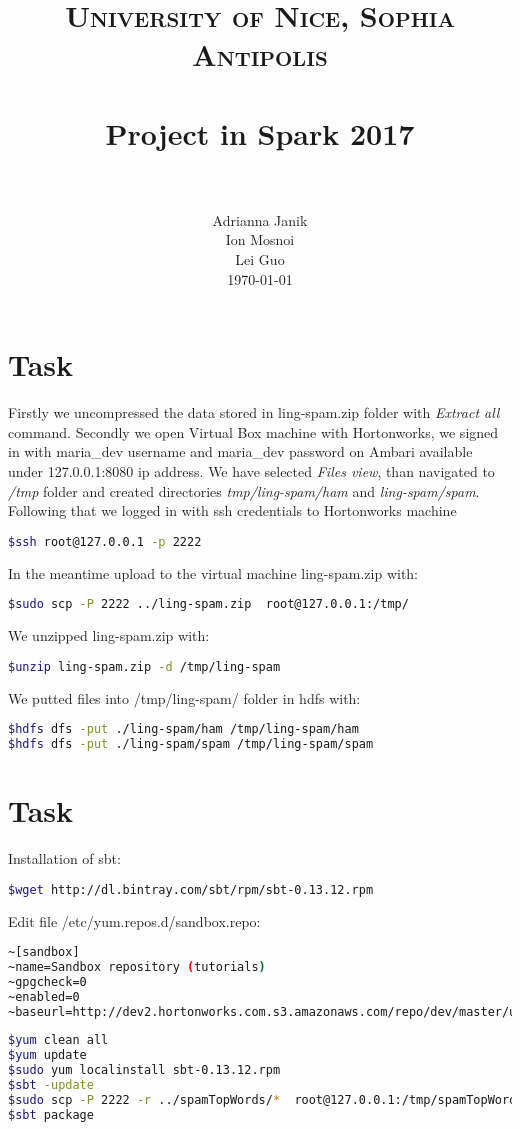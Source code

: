\documentclass[paper=a4, fontsize=11pt]{scrartcl}
\title{
		\usefont{OT1}{bch}{b}{n}
		\normalfont \normalsize \textsc{University of Nice, Sophia Antipolis} \\ [25pt]
		\horrule{0.5pt} \\[0.4cm]
		\huge Project in Spark 2017 \\
		\horrule{2pt} \\[0.5cm]
}
\author{
		\normalfont \normalsize
        Adrianna Janik\\	\normalfont \normalsize
Ion Mosnoi\\	\normalfont \normalsize
Lei Guo \\ \normalsize
        \today
}
\date{}
\numberwithin{equation}{section}		%
\numberwithin{figure}{section}			%
\numberwithin{table}{section}				%
\begin{document}
\maketitle
\section{Task}
Firstly we uncompressed the data stored in ling-spam.zip folder with \textit{Extract all} command. 
Secondly we open Virtual Box machine with Hortonworks, we signed in with maria\_dev username and maria\_dev password on Ambari available under 127.0.0.1:8080 ip address. We have selected \textit{Files view}, than navigated to \textit{/tmp} folder and created directories \textit{tmp/ling-spam/ham} and \textit{ling-spam/spam}. Following that we logged in with ssh credentials to Hortonworks machine
\begin{lstlisting}[language=bash]
$ssh root@127.0.0.1 -p 2222
\end{lstlisting}
In the meantime upload to the virtual machine ling-spam.zip with:
\begin{lstlisting}[language=bash]
$sudo scp -P 2222 ../ling-spam.zip  root@127.0.0.1:/tmp/
\end{lstlisting}
We unzipped ling-spam.zip with:
\begin{lstlisting}[language=bash]
$unzip ling-spam.zip -d /tmp/ling-spam
\end{lstlisting}
We putted files into /tmp/ling-spam/ folder in hdfs with:
\begin{lstlisting}[language=bash]
$hdfs dfs -put ./ling-spam/ham /tmp/ling-spam/ham
$hdfs dfs -put ./ling-spam/spam /tmp/ling-spam/spam
\end{lstlisting}

\section{Task}
Installation of sbt:
\begin{lstlisting}[language=bash]
$wget http://dl.bintray.com/sbt/rpm/sbt-0.13.12.rpm
\end{lstlisting}
Edit file /etc/yum.repos.d/sandbox.repo:
\begin{lstlisting}[language=bash]
~[sandbox]
~name=Sandbox repository (tutorials)
~gpgcheck=0
~enabled=0
~baseurl=http://dev2.hortonworks.com.s3.amazonaws.com/repo/dev/master/utils/
\end{lstlisting}

\begin{lstlisting}[language=bash]
$yum clean all
$yum update
$sudo yum localinstall sbt-0.13.12.rpm
$sbt -update
$sudo scp -P 2222 -r ../spamTopWords/*  root@127.0.0.1:/tmp/spamTopWords/
$sbt package
\end{lstlisting}
\end{document}
